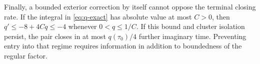 Finally, a bounded exterior correction by itself cannot oppose the
terminal closing rate. If the integral in \eqref{eq:q-exact} has
absolute value at most \(C>0\), then
\(q'\le-8+4Cq\le-4\) whenever \(0<q\le1/C\).
If this bound and cluster isolation persist, the pair closes in
at most \(q(\tau_0)/4\) further imaginary time. Preventing entry
into that regime requires information in addition to boundedness
of the regular factor.
